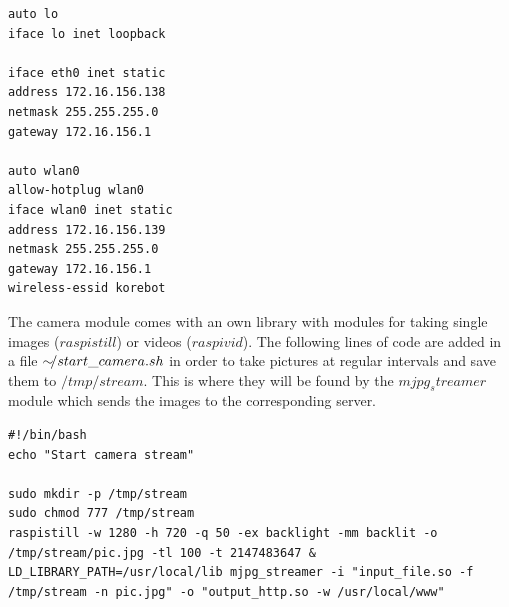 \begin{center}
\begin{minipage}{0.9\linewidth}
\begin{lstlisting}[caption=$/etc/network/interfaces$, label=interfaces, frame=none]
auto lo
iface lo inet loopback

iface eth0 inet static
address 172.16.156.138
netmask 255.255.255.0
gateway 172.16.156.1

auto wlan0
allow-hotplug wlan0
iface wlan0 inet static
address 172.16.156.139
netmask 255.255.255.0
gateway 172.16.156.1
wireless-essid korebot
\end{lstlisting}
\end{minipage}
\end{center}

The camera module comes with an own library with modules for taking single images ($raspistill$) or videos ($raspivid$).
The following lines of code are added in a file $\sim\hspace{-0.5em}/start\_camera.sh$ in order to take pictures at regular intervals and save them to $/tmp/stream$. This is where they will be found by the $mjpg_streamer$ module which sends the images to the corresponding server.

\begin{center}
\begin{minipage}{0.9\linewidth}
\begin{lstlisting}[caption=$\sim\hspace{-0.5em}/start\_camera.sh$, label=startcamera, frame=none]
#!/bin/bash
echo "Start camera stream"

sudo mkdir -p /tmp/stream
sudo chmod 777 /tmp/stream
raspistill -w 1280 -h 720 -q 50 -ex backlight -mm backlit -o /tmp/stream/pic.jpg -tl 100 -t 2147483647 &
LD_LIBRARY_PATH=/usr/local/lib mjpg_streamer -i "input_file.so -f /tmp/stream -n pic.jpg" -o "output_http.so -w /usr/local/www"
\end{lstlisting}
\end{minipage}
\end{center}

